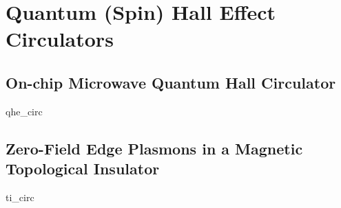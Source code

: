 \chapter{Quantum (Spin) Hall Effect Circulators}

\clearpage
\section{On-chip Microwave Quantum Hall Circulator}
\label{sec:hallcirc}
{qhe_circ}

\clearpage
\section{Zero-Field Edge Plasmons in a Magnetic Topological Insulator}
\label{sec:spinhallcirc}
{ti_circ}

